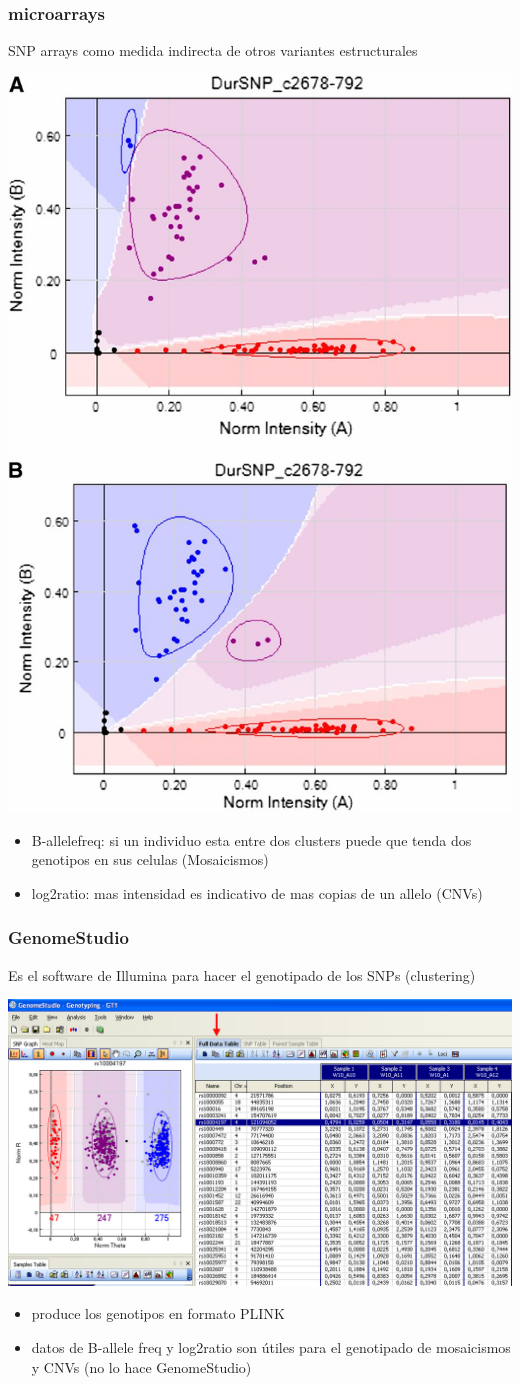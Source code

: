 \documentclass{beamer}\usepackage[]{graphicx}\usepackage[]{color}
\begin{document}
\begin{frame}[fragile] 
\frametitle{microarrays}

SNP arrays como medida indirecta de otros variantes estructurales
\begin{center}
\includegraphics[width=0.3\linewidth]{clustermicro.jpg}
\end{center}

\begin{itemize}
\item B-allelefreq: si un individuo esta entre dos clusters puede que tenda dos genotipos en sus celulas (Mosaicismos) 
\item log2ratio: mas intensidad es indicativo de mas copias de un allelo (CNVs)
\end{itemize}

\end{frame}



\begin{frame}[fragile]
\frametitle{GenomeStudio}
Es el software de Illumina para hacer el genotipado de los SNPs (clustering)
\newline
\begin{center}
\includegraphics[width=0.5\linewidth]{genomestudio.jpg}
\end{center}

\begin{itemize}
\item produce los genotipos en formato PLINK 
\item datos de B-allele freq y log2ratio son \'utiles para el genotipado de mosaicismos y CNVs (no lo hace GenomeStudio)
\end{itemize}

\end{frame}
\end{document}
